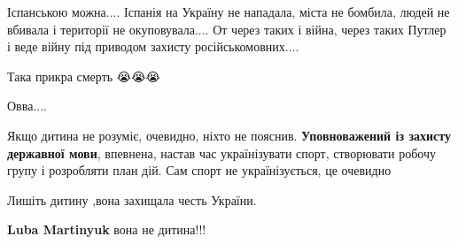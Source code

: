 \begin{itemize}
Іспанською можна.... Іспанія на Україну не нападала, міста не бомбила, людей не
вбивала і території не окуповувала.... От через таких і війна, через таких
Путлер і веде війну під приводом захисту російськомовних....


 
Така прикра смерть 😭😭😭

 
Овва....

 
Якщо дитина не розуміє, очевидно, ніхто не пояснив. \textbf{Уповноважений із захисту
державної мови}, впевнена, настав час українізувати спорт, створювати робочу
групу і розробляти план дій. Сам спорт не українізується, це очевидно

 
Лишіть дитину ,вона захищала честь України.

\begin{itemize}
 
\textbf{Luba Martinyuk} вона не дитина!!!
\end{itemize}

 

\end{itemize}
